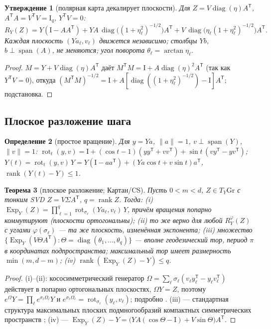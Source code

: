 \documentclass[11pt,a4paper]{article}
\newcommand{\Id}{\mathrm I}
\newcommand{\T}{^{\mathsf T}}
\newcommand{\Gr}{\mathrm{Gr}}
\newcommand{\Exp}{\operatorname{Exp}}
\newcommand{\rot}{\operatorname{rot}}
\DeclareMathOperator{\rank}{rank}
\DeclareMathOperator{\diag}{diag}
\DeclareMathOperator{\spanop}{span}
\newtheorem{theorem}{Теорема}[section]
\newtheorem{proposition}[theorem]{Утверждение}
\newtheorem{definition}[theorem]{Определение}
\theoremstyle{remark}
\begin{document}
\begin{proposition}[полярная карта декалирует плоскости]\label{prop:polardecomp}
Для $Z=V\diag(\eta)A\T$, $A\T A=V\T V=\Id_q$, $Y\T V=0$:
\begin{equation}\label{eq:polarplane}
 R_Y(Z)=Y(\Id-AA\T)+YA\,\diag\!\bigl((1+\eta_\ell^2)^{-1/2}\bigr)A\T
 +V\,\diag\!\bigl(\eta_\ell(1+\eta_\ell^2)^{-1/2}\bigr)A\T.
\end{equation}
Каждая плоскость $(Ya_\ell,v_\ell)$ движется независимо; столбцы $Yb$,
 $b\perp\spanop(A)$, не меняются; угол поворота $\theta_\ell=\arctan\eta_\ell$.
\end{proposition}
\begin{proof}
 $M=Y+V\diag(\eta)A\T$ даёт $M\T M=\Id+A\diag(\eta)^2A\T$ (так как $Y\T V=0$),
откуда $(M\T M)^{-1/2}=\Id+A[\diag((1+\eta_\ell^2)^{-1/2})-\Id]A\T$; подстановка.
\end{proof}

\subsection{Плоское разложение шага}\label{sec:cartan}

\begin{definition}[простое вращение]\label{def:plane}
Для $y=Ya$, $\|a\|=1$, $v\perp\spanop(Y)$, $\|v\|=1$:
 $\rot_t(y,v)=\Id+(\cos t-1)(yy\T+vv\T)+\sin t\,(vy\T-yv\T)$;
 $Y(t)=\rot_t(y,v)\,Y=Y(\Id-aa\T)+(Ya\cos t+v\sin t)a\T$,
 $\rank(Y(t)-Y)\le1$.
\end{definition}

\begin{theorem}[плоское разложение; Картан/CS]\label{thm:cartan}
Пусть $0<m<d$, $Z\in T_Y\Gr$ с тонким SVD $Z=V\Sigma A\T$, $q=\rank Z$.
Тогда:
(i) $\Exp_Y(Z)=\prod_{\ell=1}^q\rot_{\sigma_\ell}(Ya_\ell,v_\ell)\,Y$,
причём вращения попарно коммутируют (плоскости ортогональны);
(ii) то же верно для любой $R^\varphi_Y(Z)$ с углами $\varphi(\sigma_\ell)$ --- та же плоскость, изменённая экспонента;
(iii) множество $\{\Exp_Y(V\Theta A\T)\colon\Theta=\diag(\theta_1,\ldots,\theta_q)\}$ --- вполне геодезический тор, период $\pi$ в координатах подпространства;
максимальный тор имеет размерность $\min(m,d-m)$;
(iv) $\rank(\Exp_Y(Z)-Y)\le q$.
\end{theorem}
\begin{proof}
(i)--(ii): кососимметрический генератор
 $\Omega=\sum_\ell\sigma_\ell(v_\ell y_\ell\T-y_\ell v_\ell\T)$ действует в
попарно ортогональных плоскостях, $\Omega Y=Z$, поэтому
 $e^\Omega Y=\prod_\ell e^{\sigma_\ell\Omega_\ell}Y$ и $e^{\sigma_\ell\Omega_\ell}
=\rot_{\sigma_\ell}(y_\ell,v_\ell)$; подробно \cite[\S2.5]{eas}.
(iii) --- стандартная структура максимальных плоских подмногообразий
компактных симметрических пространств \cite{helgason,gvl}; (iv) ---
 $\Exp_Y(Z)-Y=\bigl(YA(\cos\Theta-\Id)+V\sin\Theta\bigr)A\T$.
\end{proof}
\end{document}
